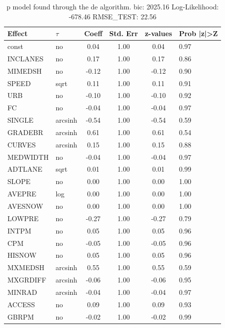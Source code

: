 \begin{table}
	\caption{p model found through the de algorithm. bic: 2025.16 Log-Likelihood: -678.46 RMSE_TEST: 22.56}
	\begin{center}
		\begin{tabular}{|l|l|c|c|c|l|}
			\hline
			Effect & $\tau$ & Coeff & Std. Err & z-values & Prob |z|>Z \\
			\hline
			const & no & 0.04 & 1.00 & 0.04 & 0.97 \\
			\hline
			INCLANES & no & 0.17 & 1.00 & 0.17 & 0.86 \\
			\hline
			MIMEDSH & no & -0.12 & 1.00 & -0.12 & 0.90 \\
			\hline
			SPEED & sqrt & 0.11 & 1.00 & 0.11 & 0.91 \\
			\hline
			URB & no & -0.10 & 1.00 & -0.10 & 0.92 \\
			\hline
			FC & no & -0.04 & 1.00 & -0.04 & 0.97 \\
			\hline
			SINGLE & arcsinh & -0.54 & 1.00 & -0.54 & 0.59 \\
			\hline
			GRADEBR & arcsinh & 0.61 & 1.00 & 0.61 & 0.54 \\
			\hline
			CURVES & arcsinh & 0.15 & 1.00 & 0.15 & 0.88 \\
			\hline
			MEDWIDTH & no & -0.04 & 1.00 & -0.04 & 0.97 \\
			\hline
			ADTLANE & sqrt & 0.01 & 1.00 & 0.01 & 0.99 \\
			\hline
			SLOPE & no & 0.00 & 1.00 & 0.00 & 1.00 \\
			\hline
			AVEPRE & log & 0.00 & 1.00 & 0.00 & 1.00 \\
			\hline
			AVESNOW & no & 0.00 & 1.00 & 0.00 & 1.00 \\
			\hline
			LOWPRE & no & -0.27 & 1.00 & -0.27 & 0.79 \\
			\hline
			INTPM & no & 0.05 & 1.00 & 0.05 & 0.96 \\
			\hline
			CPM & no & -0.05 & 1.00 & -0.05 & 0.96 \\
			\hline
			HISNOW & no & 0.05 & 1.00 & 0.05 & 0.96 \\
			\hline
			MXMEDSH & arcsinh & 0.55 & 1.00 & 0.55 & 0.59 \\
			\hline
			MXGRDIFF & arcsinh & -0.06 & 1.00 & -0.06 & 0.95 \\
			\hline
			MINRAD & arcsinh & -0.04 & 1.00 & -0.04 & 0.97 \\
			\hline
			ACCESS & no & 0.09 & 1.00 & 0.09 & 0.93 \\
			\hline
			GBRPM & no & -0.02 & 1.00 & -0.02 & 0.99 \\

\end{tabular}
\end{center}
\end{table}
